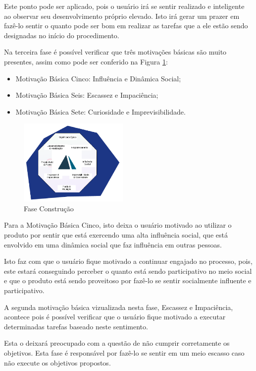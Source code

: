 Este ponto pode ser aplicado, pois o usuário irá se sentir realizado e inteligente
ao observar seu desenvolvimento próprio elevado. Isto irá gerar um prazer em fazê-lo
sentir o quanto pode ser bom em realizar as tarefas que a ele estão sendo designadas
no início do procedimento.

Na terceira fase é possível verificar que três motivações básicas são muito presentes,
assim como pode ser conferido na Figura \ref{fig:faseconstrucao}:



\begin{itemize}
    \item Motivação Básica Cinco: Influência e Dinâmica Social;
    \item Motivação Básica Seis: Escassez e Impaciência;
    \item Motivação Básica Sete: Curiosidade e Imprevisibilidade.
\end{itemize}

\begin{figure}[h]
    \centering
    \includegraphics[width=200px, scale=1]{figuras/faseconstrucao}
    \caption{Fase Construção}
    \label{fig:faseconstrucao}
\end{figure}


Para a Motivação Básica Cinco, isto deixa o usuário motivado ao utilizar o produto
por sentir que está exercendo uma alta influência social, que está envolvido em
uma dinâmica social que faz influência em outras pessoas.

Isto faz com que o usuário fique motivado a continuar engajado no processo, pois,
este estará conseguindo perceber o quanto está sendo participativo no meio social
e que o produto está sendo proveitoso por fazê-lo se sentir socialmente influente
e participativo.


A segunda motivação básica vizualizada nesta fase, Escassez e Impaciência, acontece
pois é possível verificar que o usuário fique motivado a executar determinadas
tarefas baseado neste sentimento.

Esta o deixará preocupado com a questão de não cumprir corretamente os objetivos.
Esta fase é responsável por fazê-lo se sentir em um meio escasso caso não execute
os objetivos propostos.

